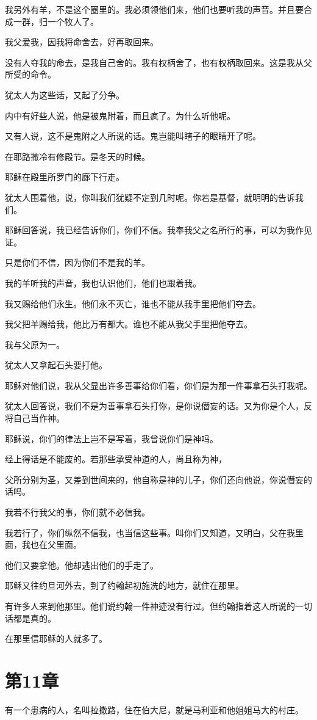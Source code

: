 \documentclass[12pt,oneside]{book}
\begin{document}
我另外有羊，不是这个圈里的。我必须领他们来，他们也要听我的声音。并且要合成一群，归一个牧人了。

我父爱我，因我将命舍去，好再取回来。

没有人夺我的命去，是我自己舍的。我有权柄舍了，也有权柄取回来。这是我从父所受的命令。

犹太人为这些话，又起了分争。

内中有好些人说，他是被鬼附着，而且疯了。为什么听他呢。

又有人说，这不是鬼附之人所说的话。鬼岂能叫瞎子的眼睛开了呢。

在耶路撒冷有修殿节。是冬天的时候。

耶稣在殿里所罗门的廊下行走。

犹太人围着他，说，你叫我们犹疑不定到几时呢。你若是基督，就明明的告诉我们。

耶稣回答说，我已经告诉你们，你们不信。我奉我父之名所行的事，可以为我作见证。

只是你们不信，因为你们不是我的羊。

我的羊听我的声音，我也认识他们，他们也跟着我。

我又赐给他们永生。他们永不灭亡，谁也不能从我手里把他们夺去。

我父把羊赐给我，他比万有都大。谁也不能从我父手里把他夺去。

我与父原为一。

犹太人又拿起石头要打他。

耶稣对他们说，我从父显出许多善事给你们看，你们是为那一件事拿石头打我呢。

犹太人回答说，我们不是为善事拿石头打你，是你说僭妄的话。又为你是个人，反将自己当作神。

耶稣说，你们的律法上岂不是写着，我曾说你们是神吗。

经上得话是不能废的。若那些承受神道的人，尚且称为神，

父所分别为圣，又差到世间来的，他自称是神的儿子，你们还向他说，你说僭妄的话吗。

我若不行我父的事，你们就不必信我。

我若行了，你们纵然不信我，也当信这些事。叫你们又知道，又明白，父在我里面，我也在父里面。

他们又要拿他。他却逃出他们的手走了。

耶稣又往约旦河外去，到了约翰起初施洗的地方，就住在那里。

有许多人来到他那里。他们说约翰一件神迹没有行过。但约翰指着这人所说的一切话都是真的。

在那里信耶稣的人就多了。

\chapter{第11章}
有一个患病的人，名叫拉撒路，住在伯大尼，就是马利亚和他姐姐马大的村庄。
\end{document}
